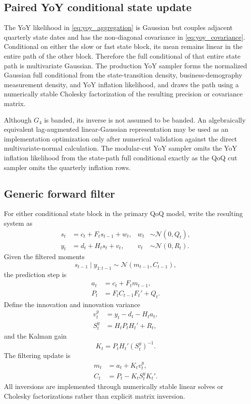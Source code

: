 \documentclass[11pt]{article}
\newcommand{\Normal}{\mathcal{N}}
\begin{document}
\subsection{Paired YoY conditional state update}

The YoY likelihood in \cref{eq:yoy_aggregation} is Gaussian but couples adjacent quarterly state dates and has the non-diagonal covariance in \cref{eq:yoy_covariance}. Conditional on either the slow or fast state block, its mean remains linear in the entire path of the other block. Therefore the full conditional of that entire state path is multivariate Gaussian. The production YoY sampler forms the normalized Gaussian full conditional from the state-transition density, business-demography measurement density, and YoY inflation likelihood, and draws the path using a numerically stable Cholesky factorization of the resulting precision or covariance matrix.

Although $G_4$ is banded, its inverse is not assumed to be banded. An algebraically equivalent lag-augmented linear-Gaussian representation may be used as an implementation optimization only after numerical validation against the direct multivariate-normal calculation. The modular-cut YoY sampler omits the YoY inflation likelihood from the state-path full conditional exactly as the QoQ cut sampler omits the quarterly inflation rows.

\subsection{Generic forward filter}

For either conditional state block in the primary QoQ model, write the resulting system as
\begin{align}
s_t&=c_t+F_ts_{t-1}+w_t,
& w_t&\sim\Normal(0,Q_t),\\
y_t&=d_t+H_ts_t+v_t,
& v_t&\sim\Normal(0,R_t).
\end{align}
Given the filtered moments
\begin{equation}
s_{t-1}\mid y_{1:t-1}\sim\Normal(m_{t-1},C_{t-1}),
\end{equation}
the prediction step is
\begin{align}
a_t&=c_t+F_tm_{t-1},\\
P_t&=F_tC_{t-1}F_t'+Q_t.
\end{align}
Define the innovation and innovation variance
\begin{align}
v_t^{y}&=y_t-d_t-H_ta_t,\\
S_t^{y}&=H_tP_tH_t'+R_t,
\end{align}
and the Kalman gain
\begin{equation}
K_t=P_tH_t'(S_t^{y})^{-1}.
\end{equation}
The filtering update is
\begin{align}
m_t&=a_t+K_tv_t^{y},\\
C_t&=P_t-K_tS_t^{y}K_t'.
\end{align}
All inversions are implemented through numerically stable linear solves or Cholesky factorizations rather than explicit matrix inversion.
\end{document}
